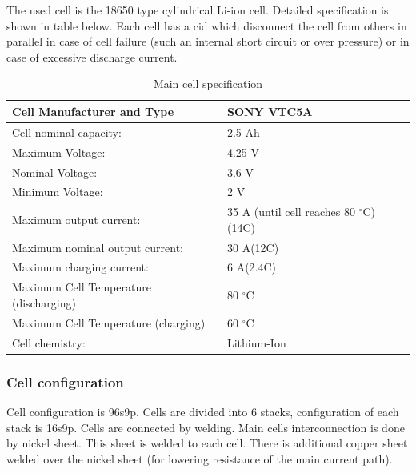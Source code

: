 The used cell is the 18650 type cylindrical Li-ion cell. Detailed specification is shown in table below. Each cell has a \gls{cid} which disconnect the cell from others in parallel in case of cell failure (such an internal short circuit or over pressure) or in case of excessive discharge current. 

\begin{table}[H]
	\centering
	\caption{Main cell specification}
	\begin{tabularx}{\textwidth}{|X|X|}
		\hline
		Cell Manufacturer and Type & SONY VTC5A \\[\TableSize]
		\hline
		Cell nominal capacity: & 2.5 Ah \\[\TableSize]
		\hline
		Maximum Voltage: & 4.25 V \\[\TableSize]
		\hline
		Nominal Voltage: & 3.6 V \\[\TableSize]
		\hline
		Minimum Voltage:  & 2 V \\[\TableSize]
		\hline
		Maximum output current: & 35 A (until cell reaches 80 $^\circ$C) (14C)\\[\TableSize]
		\hline
		Maximum nominal output current: & 30 A(12C) \\[\TableSize]
		\hline
		Maximum charging current: & 6 A(2.4C) \\[\TableSize]
		\hline
		Maximum Cell Temperature (discharging) & 80 $^\circ$C \\[\TableSize]
		\hline
		Maximum Cell Temperature (charging) & 60 $^\circ$C \\[\TableSize]
		\hline
		Cell chemistry: & Lithium-Ion \\[\TableSize]
		\hline
	\end{tabularx}%
	\label{tab:acc-cell}%
\end{table}%

\subsubsection{Cell configuration}

Cell configuration is 96s9p. Cells are divided into 6 stacks, configuration of each stack is 16s9p. Cells are connected by welding. Main cells interconnection is done by nickel sheet. This sheet is welded to each cell. There is additional copper sheet welded over the nickel sheet (for lowering resistance of the main current path).

